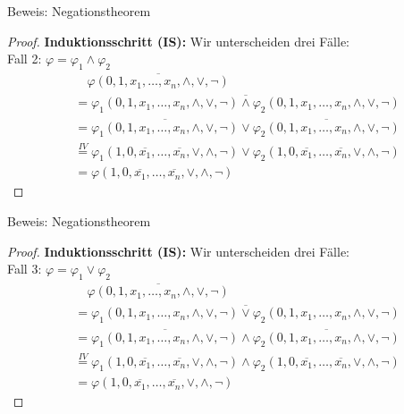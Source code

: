 \documentclass[12pt%
,aspectratio=169%
]{beamer}
\begin{document}
\begin{frame}{Beweis: Negationstheorem}
\begin{proof}
\textbf{Induktionsschritt (IS):} Wir unterscheiden drei Fälle:\\
Fall 2: $\varphi = \varphi_1 \land \varphi_2$
\begin{align*}
&\quad \overline{\varphi(0, 1, x_1 , \ldots , x_n , \land, \lor, \neg)}\\
&= \overline{\varphi_1(0, 1, x_1 , \ldots , x_n , \land, \lor, \neg) \land \varphi_2(0, 1, x_1 , \ldots , x_n , \land, \lor, \neg)}\\
&= \overline{\varphi_1(0, 1, x_1 , \ldots , x_n , \land, \lor, \neg)} \lor \overline{\varphi_2(0, 1, x_1 , \ldots , x_n , \land, \lor, \neg)}\\
&\overset{IV}= \varphi_1(1, 0, \overline{x_1} , \ldots ,\overline{x_n} , \lor, \land, \neg) \lor \varphi_2(1, 0, \overline{x_1} , \ldots ,\overline{x_n} , \lor, \land, \neg)\\
&= \varphi(1, 0, \overline{x_1} , \ldots ,\overline{x_n} , \lor, \land, \neg)
\end{align*}
\end{proof}
\end{frame}

\begin{frame}{Beweis: Negationstheorem}
\begin{proof}
\textbf{Induktionsschritt (IS):} Wir unterscheiden drei Fälle:\\
Fall 3: $\varphi = \varphi_1 \lor \varphi_2$
\begin{align*}
&\quad \overline{\varphi(0, 1, x_1 , \ldots , x_n , \land, \lor, \neg)}\\
&= \overline{\varphi_1(0, 1, x_1 , \ldots , x_n , \land, \lor, \neg) \lor \varphi_2(0, 1, x_1 , \ldots , x_n , \land, \lor, \neg)}\\
&= \overline{\varphi_1(0, 1, x_1 , \ldots , x_n , \land, \lor, \neg)} \land \overline{\varphi_2(0, 1, x_1 , \ldots , x_n , \land, \lor, \neg)}\\
&\overset{IV}= \varphi_1(1, 0, \overline{x_1} , \ldots ,\overline{x_n} , \lor, \land, \neg) \land \varphi_2(1, 0, \overline{x_1} , \ldots ,\overline{x_n} , \lor, \land, \neg)\\
&= \varphi(1, 0, \overline{x_1} , \ldots ,\overline{x_n} , \lor, \land, \neg)
\end{align*}
\end{proof}
\end{frame}
\end{document}
